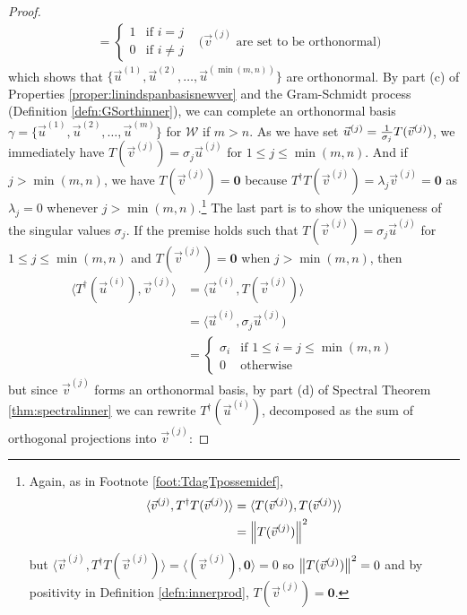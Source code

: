 \begin{proof}
\begin{align}
&= 
\begin{cases}
1 & \text{if } i = j \\
0 & \text{if } i \neq j
\end{cases}
& \text{($\vec{v}^{(j)}$ are set to be orthonormal)}
\end{align}
which shows that $\{\vec{u}^{(1)}, \vec{u}^{(2)},\ldots,\vec{u}^{(\min(m,n))}\}$ are orthonormal. By part (c) of Properties \ref{proper:linindspanbasisnewver} and the Gram-Schmidt process (Definition \ref{defn:GSorthinner}), we can complete an orthonormal basis $\gamma = \{\vec{u}^{(1)}, \vec{u}^{(2)},\ldots,\vec{u}^{(m)}\}$ for $\mathcal{W}$ if $m > n$. As we have set $\vec{u}^{(j)} = \smash{\frac{1}{\sigma_j}T(\vec{v}^{(j)})}$, we immediately have $T(\vec{v}^{(j)}) = \sigma_j\vec{u}^{(j)}$ for $1 \leq j \leq \min(m,n)$. And if $j > \min(m,n)$, we have $T(\vec{v}^{(j)}) = \textbf{0}$ because $T^\dag T(\vec{v}^{(j)}) = \lambda_j \vec{v}^{(j)} = \textbf{0}$ as $\lambda_j = 0$ whenever $j > \min(m,n)$.\footnote{Again, as in Footnote \ref{foot:TdagTpossemidef}, 
\begin{align*}
\langle \vec{v}^{(j)}, T^\dag T (\vec{v}^{(j)}) \rangle &= \langle T(\vec{v}^{(j)}), T(\vec{v}^{(j)}) \rangle \\
&= \norm{T(\vec{v}^{(j)})}^2
\end{align*}
but $\langle \vec{v}^{(j)}, T^\dag T(\vec{v}^{(j)}) \rangle = \langle (\vec{v}^{(j)}), \textbf{0} \rangle = 0$ so $\norm{T(\vec{v}^{(j)})}^2 = 0$ and by positivity in Definition \ref{defn:innerprod}, $T(\vec{v}^{(j)}) = \textbf{0}$.}
The last part is to show the uniqueness of the singular values $\sigma_j$. If the premise holds such that $T(\vec{v}^{(j)}) = \sigma_j \vec{u}^{(j)}$ for $1\leq j \leq \min(m,n)$ and $T(\vec{v}^{(j)}) = \textbf{0}$ when $j > \min(m,n)$, then
\begin{align}
\langle T^\dag(\vec{u}^{(i)}), \vec{v}^{(j)} \rangle &= \langle \vec{u}^{(i)}, T(\vec{v}^{(j)}) \rangle \nonumber \\
&= \langle \vec{u}^{(i)}, \sigma_j \vec{u}^{(j)}) \nonumber \\
&= \begin{cases}
\sigma_i & \text{if } 1 \leq i = j \leq \min(m,n) \\
0 & \text{otherwise} 
\end{cases}
\end{align}
but since $\vec{v}^{(j)}$ forms an orthonormal basis, by part (d) of Spectral Theorem \ref{thm:spectralinner} we can rewrite $T^\dag (\vec{u}^{(i)})$, decomposed as the sum of orthogonal projections into $\vec{v}^{(j)}$:

\end{proof}
